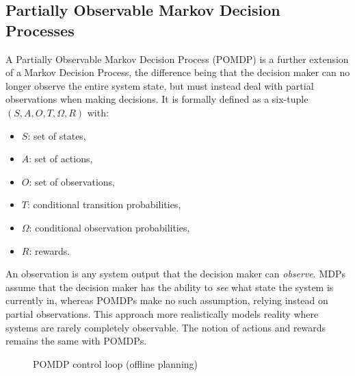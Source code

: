 \subsection{Partially Observable Markov Decision Processes}
\label{subsec:pomdp}


A Partially Observable Markov Decision Process (POMDP) is a further extension of a Markov Decision Process, the difference being that the decision maker can no longer observe the entire system state, but must instead deal with partial observations when making decisions. It is formally defined as a six-tuple $(S,A,O,T,\Omega,R)$ with:
\begin{itemize}
\item $S$: set of states,
\item $A$: set of actions,
\item $O$: set of observations,
\item $T$: conditional transition probabilities,
\item $\Omega$: conditional observation probabilities,
\item $R$: rewards.
\end{itemize}

An observation is any system output that the decision maker can \textit{observe}. MDPs assume that the decision maker has the ability to \textit{see} what state the system is currently in, whereas POMDPs make no such assumption, relying instead on partial observations. This approach more realistically models reality where systems are rarely completely observable. The notion of actions and rewards remains the same with POMDPs. 

\begin{figure}
\begin{center}
\end{center}
\caption{POMDP control loop (offline planning)}
\label{pomdpcontrolbasic}
\end{figure}

